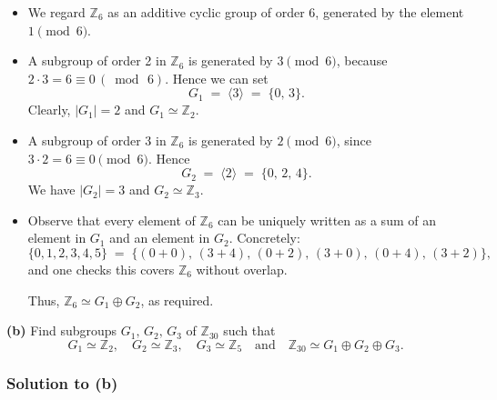 \documentclass[12pt]{article}
\theoremstyle{definition} %
\theoremstyle{plain} %
\begin{document}
\begin{itemize}
  \item We regard $\mathbb{Z}_6$ as an additive cyclic group of order $6$, generated by the element $1 \pmod{6}$.
  \item A subgroup of order 2 in $\mathbb{Z}_6$ is generated by $3 \pmod{6}$, because $2 \cdot 3 = 6 \equiv 0 \,(\bmod\,6)$. Hence we can set 
  \[
    G_1 \;=\; \langle 3 \rangle \;=\; \{0,\,3\}.
  \]
  Clearly, $|G_1|=2$ and $G_1 \simeq \mathbb{Z}_2$.

  \item A subgroup of order 3 in $\mathbb{Z}_6$ is generated by $2 \pmod{6}$, since $3\cdot 2 = 6 \equiv 0\pmod{6}$. Hence 
  \[
    G_2 \;=\; \langle 2 \rangle \;=\; \{0,\,2,\,4\}.
  \]
  We have $|G_2|=3$ and $G_2 \simeq \mathbb{Z}_3$.

  \item Observe that every element of $\mathbb{Z}_6$ can be uniquely written as a sum of an element in $G_1$ and an element in $G_2$.  Concretely:
  \[
    \{0,1,2,3,4,5\}
    \;=\;
    \{ (0+0),\,(3+4),\,(0+2),\,(3+0),\,(0+4),\,(3+2)\},
  \]
  and one checks this covers $\mathbb{Z}_6$ without overlap.
  
  Thus, $\mathbb{Z}_6 \simeq G_1 \oplus G_2$, as required.
\end{itemize}

\bigskip

\noindent\textbf{(b)} Find subgroups $G_1,\,G_2,\,G_3$ of $\mathbb{Z}_{30}$ such that 
\[
  G_1 \simeq \mathbb{Z}_2,\quad
  G_2 \simeq \mathbb{Z}_3,\quad
  G_3 \simeq \mathbb{Z}_5
  \quad\text{and}\quad
  \mathbb{Z}_{30} \simeq G_1 \oplus G_2 \oplus G_3.
\]

\subsubsection*{Solution to (b)}
\end{document}
